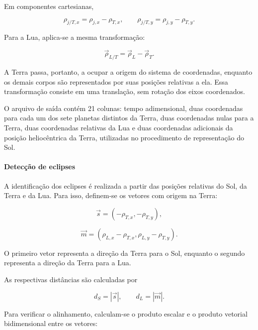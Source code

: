 \documentclass[12pt,a4paper]{article}
\begin{document}
Em componentes cartesianas,

\begin{equation}
    \rho_{j/T,x}=\rho_{j,x}-\rho_{T,x},
    \qquad
    \rho_{j/T,y}=\rho_{j,y}-\rho_{T,y}.
\end{equation}

Para a Lua, aplica-se a mesma transformação:

\begin{equation}
    \vec{\rho}_{L/T}
    =
    \vec{\rho}_L-\vec{\rho}_T.
\end{equation}

A Terra passa, portanto, a ocupar a origem do sistema de coordenadas, enquanto os demais corpos são representados por suas posições relativas a ela. Essa transformação consiste em uma translação, sem rotação dos eixos coordenados.

O arquivo de saída contém 21 colunas: tempo adimensional, duas coordenadas para cada um dos sete planetas distintos da Terra, duas coordenadas nulas para a Terra, duas coordenadas relativas da Lua e duas coordenadas adicionais da posição heliocêntrica da Terra, utilizadas no procedimento de representação do Sol.

\paragraph{Detecção de eclipses}

A identificação dos eclipses é realizada a partir das posições relativas do Sol, da Terra e da Lua. Para isso, definem-se os vetores com origem na Terra:

\begin{equation}
    \vec{s}=(-\rho_{T,x},-\rho_{T,y}),
\end{equation}

\begin{equation}
    \vec{m}=
    (\rho_{L,x}-\rho_{T,x},
    \rho_{L,y}-\rho_{T,y}).
\end{equation}

O primeiro vetor representa a direção da Terra para o Sol, enquanto o segundo representa a direção da Terra para a Lua.

As respectivas distâncias são calculadas por

\begin{equation}
    d_S=|\vec{s}|,
    \qquad
    d_L=|\vec{m}|.
\end{equation}

Para verificar o alinhamento, calculam-se o produto escalar e o produto vetorial bidimensional entre os vetores:
\end{document}
